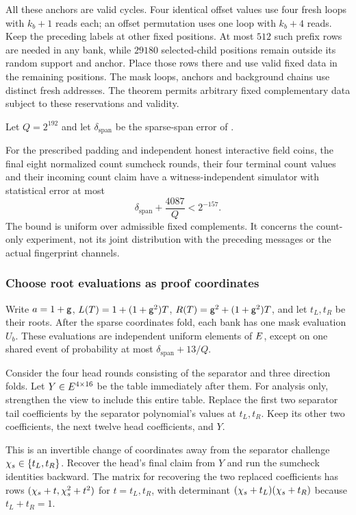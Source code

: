 All these anchors are valid cycles. Four identical offset values use four fresh loops with $k_b+1$ reads each; an offset permutation uses one loop with $k_b+4$ reads. Keep the preceding labels at other fixed positions. At most $512$ such prefix rows are needed in any bank, while $29180$ selected-child positions remain outside its random support and anchor. Place those rows there and use valid fixed data in the remaining positions. The mask loops, anchors and background chains use distinct fresh addresses. The theorem permits arbitrary fixed complementary data subject to these reservations and validity.

Let $Q=2^{192}$ and let $\delta_{\mathrm{span}}$ be the sparse-span error of .

\begin{theorem}
For the prescribed padding and independent honest interactive field coins, the final eight normalized count sumcheck rounds, their four terminal count values and their incoming count claim have a witness-independent simulator with statistical error at most
\[
 \delta_{\mathrm{span}}+\frac{4087}{Q}<2^{-157}.
\]
The bound is uniform over admissible fixed complements. It concerns the count-only experiment, not its joint distribution with the preceding messages or the actual fingerprint channels.
\end{theorem}

\subsubsection{Choose root evaluations as proof coordinates}

Write $a=1+\mathsf{g}$, $L(T)=1+(1+\mathsf{g}^2)T$, $R(T)=\mathsf{g}^2+(1+\mathsf{g}^2)T$, and let $t_L,t_R$ be their roots. After the sparse coordinates fold, each bank has one mask evaluation $U_b$. These evaluations are independent uniform elements of $E$, except on one shared event of probability at most $\delta_{\mathrm{span}}+13/Q$.

Consider the four head rounds consisting of the separator and three direction folds. Let $Y\in E^{4\times16}$ be the table immediately after them. For analysis only, strengthen the view to include this entire table. Replace the first two separator tail coefficients by the separator polynomial's values at $t_L,t_R$. Keep its other two coefficients, the next twelve head coefficients, and $Y$.

This is an invertible change of coordinates away from the separator challenge $\chi_s\in\{t_L,t_R\}$. Recover the head's final claim from $Y$ and run the sumcheck identities backward. The matrix for recovering the two replaced coefficients has rows $(\chi_s+t,\chi_s^2+t^2)$ for $t=t_L,t_R$, with determinant $(\chi_s+t_L)(\chi_s+t_R)$ because $t_L+t_R=1$.

